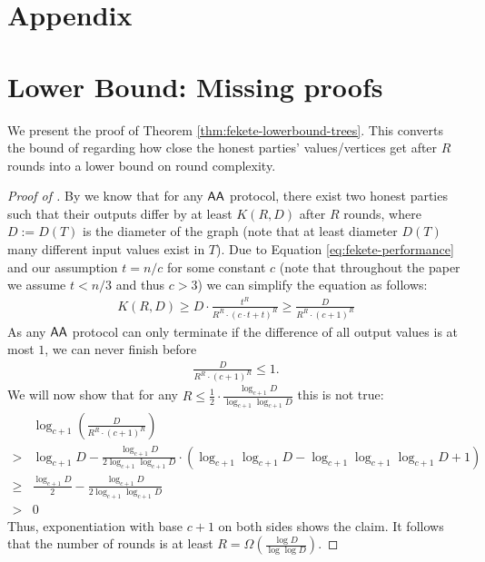 \appendix
\section*{Appendix}

\section{Lower Bound: Missing proofs} \label{appendix:lower-bound}
We present the proof of Theorem \ref{thm:fekete-lowerbound-trees}. This converts the bound of \cite{Fekete90} regarding how close the honest parties' values/vertices get after $R$ rounds into a lower bound on round complexity.

\FeketeCorollary*
\begin{proof}[Proof of ]
    By  we know that for any $\textsf{AA}$ protocol, there exist two honest parties such that their outputs differ by at least $K(R, D)$ after $R$ rounds, where $D := D(T)$ is the diameter of the graph (note that at least diameter $D(T)$ many different input values exist in $T$). Due to Equation \ref{eq:fekete-performance} and our assumption $t = n/c$ for some constant $c$ (note that throughout the paper we assume $t < n/3$ and thus $c > 3$) we can simplify the equation as follows:
    \begin{align*}
        K(R, D) \geq D \cdot \frac{t^R}{R^R \cdot (c \cdot t+t)^R} \geq \frac{D}{R^R \cdot (c+1)^R}
    \end{align*}
    As any $\textsf{AA}$ protocol can only terminate if the difference of all output values is at most $1$, we can never finish before
    \begin{align*}
        \frac{D}{R^R \cdot (c+1)^R} \leq 1.
    \end{align*}
    We will now show that for any $R \leq \frac{1}{2} \cdot \frac{\log_{c+1} D}{\log_{c+1} \log_{c+1} D}$ this is not true:
    \begin{align*}
        & \log_{c+1} \left(  \frac{D}{R^R \cdot (c+1)^R} \right) \\
        >& \log_{c+1} D - \frac{\log_{c+1} D}{2\log_{c+1} \log_{c+1} D} \cdot \left(\log_{c+1} \log_{c+1} D- \log_{c+1} \log_{c+1} \log_{c+1} D + 1 \right) \\
        \geq& \frac{\log_{c+1} D}{2} -  \frac{\log_{c+1} D}{2 \log_{c+1} \log_{c+1} D} \\
        >& 0
    \end{align*}
    Thus, exponentiation with base $c+1$ on both sides shows the claim. It follows that the number of rounds is at least $R = \Omega(\frac{\log D}{\log \log D})$.
\end{proof}


